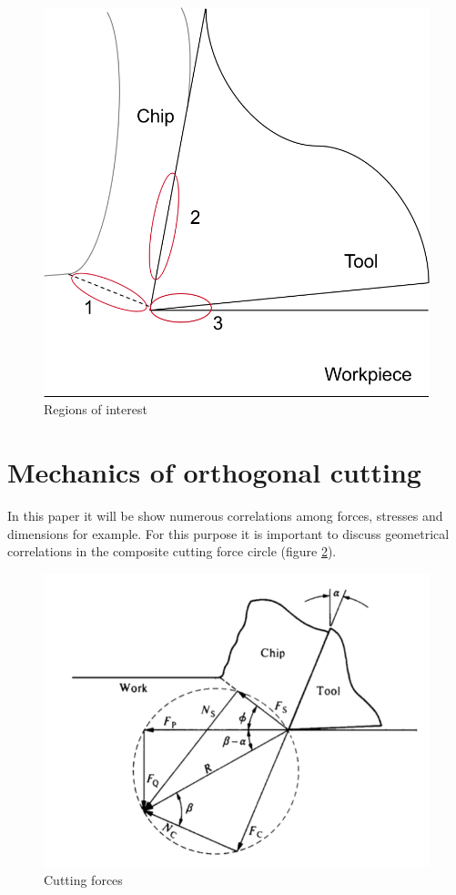 	\begin{figure}[h]
		\centering
		\captionsetup{justification=centering}
		\includegraphics[scale=0.5]{Imagens/heatZones.png}
		\caption{Regions of interest}
		\label{fig:heatZones}
	\end{figure}

	\section{Mechanics of orthogonal cutting}

	In this paper it will be show numerous correlations among forces, stresses and dimensions for example. For this purpose it is important to discuss geometrical correlations in the composite cutting force circle (figure \ref{fig:circlec}).

	\begin{figure}[h]
		\centering
		\captionsetup{justification=centering}
		\includegraphics[scale=0.5]{Cap1/circlec.png}
		\caption{Cutting forces \cite{shaw2005metal}}
		\label{fig:circlec}
	\end{figure}

